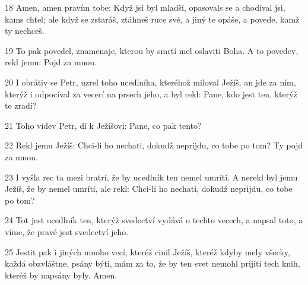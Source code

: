\par 18 Amen, amen pravím tobe: Když jsi byl mladší, opasovals se a chodíval jsi, kams chtel; ale když se zstaráš, ztáhneš ruce své, a jiný te opáše, a povede, kamž ty nechceš.
\par 19 To pak povedel, znamenaje, kterou by smrtí mel oslaviti Boha. A to povedev, rekl jemu: Pojd za mnou.
\par 20 I obrátiv se Petr, uzrel toho ucedlníka, kteréhož miloval Ježíš, an jde za ním, kterýž i odpocíval za vecerí na prsech jeho, a byl rekl: Pane, kdo jest ten, kterýž te zradí?
\par 21 Toho videv Petr, dí k Ježíšovi: Pane, co pak tento?
\par 22 Rekl jemu Ježíš: Chci-li ho nechati, dokudž neprijdu, co tobe po tom? Ty pojd za mnou.
\par 23 I vyšla rec ta mezi bratrí, že by ucedlník ten nemel umríti. A nerekl byl jemu Ježíš, že by nemel umríti, ale rekl: Chci-li ho nechati, dokudž neprijdu, co tobe po tom?
\par 24 Tot jest ucedlník ten, kterýž svedectví vydává o techto vecech, a napsal toto, a víme, že pravé jest svedectví jeho.
\par 25 Jestit pak i jiných mnoho vecí, kteréž cinil Ježíš, kteréž kdyby mely všecky, každá obzvláštne, psány býti, mám za to, že by ten svet nemohl prijíti tech knih, kteréž by napsány byly. Amen.


